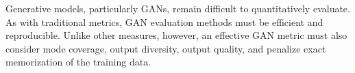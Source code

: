 Generative models, particularly GANs, remain difficult to quantitatively evaluate.
As with traditional metrics, GAN evaluation methods must be efficient and reproducible. 
Unlike other measures, however, an effective GAN metric must also consider mode coverage, output diversity, output quality, and penalize exact memorization of the training data.